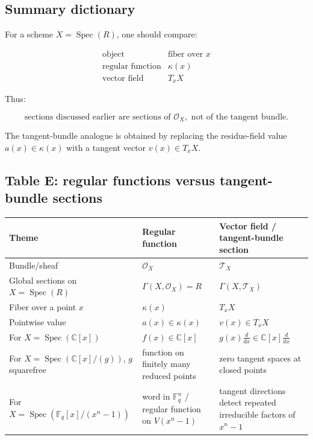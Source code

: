 \documentclass[11pt]{article}
\theoremstyle{definition}
\newcommand{\C}{\mathbb{C}}
\newcommand{\F}{\mathbb{F}}
\newcommand{\Spec}{\operatorname{Spec}}
\newcommand{\kk}[1]{\kappa\!\left(#1\right)}
\begin{document}
\subsection{Summary dictionary}

For a scheme \(X=\Spec(R)\), one should compare:

\[
\begin{array}{c|c}
	\text{object} & \text{fiber over }x \\
	\hline
	\text{regular function} & \kk{x} \\
	\text{vector field} & T_xX
\end{array}
\]

Thus:

\[
\boxed{
	\text{sections discussed earlier are sections of }\mathcal O_X,
	\text{ not of the tangent bundle.}
}
\]

The tangent-bundle analogue is obtained by replacing the residue-field value \(a(x)\in \kk{x}\) with a tangent vector \(v(x)\in T_xX\).

\newpage

\subsection*{Table E: regular functions versus tangent-bundle sections}

\begin{longtable}{@{}p{}p{}p{}@{}}
	\toprule
	\textbf{Theme} & \textbf{Regular function} & \textbf{Vector field / tangent-bundle section} \\ \midrule
	Bundle/sheaf & \(\mathcal O_X\) & \(\mathcal T_X\) \\
	Global sections on \(X=\Spec(R)\) & \(\Gamma(X,\mathcal O_X)=R\) & \(\Gamma(X,\mathcal T_X)\) \\
	Fiber over a point \(x\) & \(\kk{x}\) & \(T_xX\) \\
	Pointwise value & \(a(x)\in \kk{x}\) & \(v(x)\in T_xX\) \\
	For \(X=\Spec(\C[x])\) & \(f(x)\in \C[x]\) & \(g(x)\frac{d}{dx}\in \C[x]\frac{d}{dx}\) \\
	For \(X=\Spec(\C[x]/(g))\), \(g\) squarefree & function on finitely many reduced points & zero tangent spaces at closed points \\
	For \(X=\Spec(\F_q[x]/(x^n-1))\) & word in \(\F_q^n\) / regular function on \(V(x^n-1)\) & tangent directions detect repeated irreducible factors of \(x^n-1\) \\
	\bottomrule
\end{longtable}
	
\end{document}
